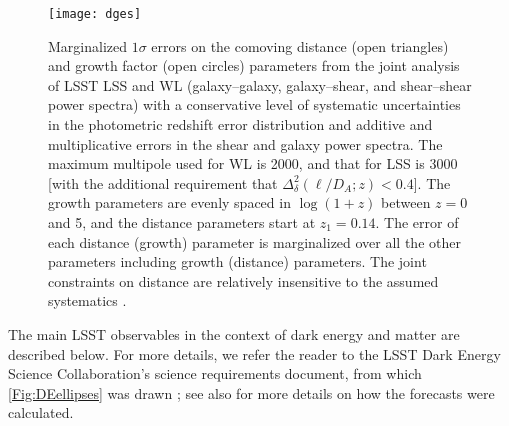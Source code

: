 \begin{figure}
\texttt{[image: dges]}
\caption{Marginalized $1\sigma$ errors on the comoving distance
(open triangles) and growth factor (open circles) parameters from
the joint analysis of LSST LSS and WL (galaxy--galaxy, galaxy--shear,
and shear--shear power spectra) with a
conservative level of systematic uncertainties in the photometric redshift error
distribution and additive and multiplicative errors in the shear and
galaxy power spectra. The maximum multipole used for WL is
2000, and that for LSS is 3000 [with the additional requirement that
$\Delta_\delta^2(\ell/D_{A};z) < 0.4$].
The growth parameters
are evenly spaced in
$\log(1+z)$ between $z = 0$ and 5, and the distance parameters
start at $z_1 = 0.14$.
The error of each distance (growth) parameter is marginalized
over all the other parameters including growth (distance) parameters. The joint constraints on
distance are relatively insensitive to the assumed systematics
\citep{2009ApJ...690..923Z}.}
\label{Fig:bao2}
\end{figure}


The main LSST observables in the context of dark energy and matter are described below. For more details, we refer the reader to the LSST Dark Energy Science Collaboration's science requirements document, from which \autoref{Fig:DEellipses} was drawn \citep{2018arXiv180901669T}; see also \citet{2017MNRAS.470.2100K} for more details on how the forecasts were calculated.

